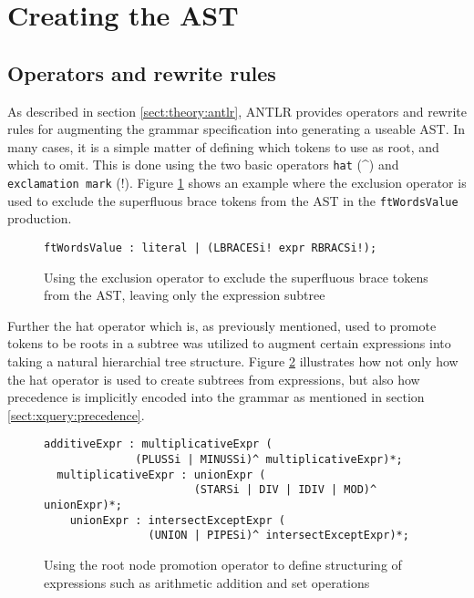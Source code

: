 \section{Creating the AST}
\subsection{Operators and rewrite rules}
As described in section \ref{sect:theory:antlr}, ANTLR provides operators and
rewrite rules for augmenting the grammar specification into generating a useable
AST. In many cases, it is a simple matter of defining which tokens to use as
root, and which to omit. This is done using the two basic operators \verb!hat!
(\^{}) and \verb!exclamation mark! (!). Figure \ref{code:ast:exoperator} shows an
example where the exclusion operator is used to exclude the superfluous brace
tokens from the AST in the \verb!ftWordsValue! production.

\begin{figure}[h]
\begin{verbatim}
ftWordsValue : literal | (LBRACESi! expr RBRACSi!);
\end{verbatim}
\caption[AST exclusion operator example]{Using the exclusion operator to exclude
the superfluous brace tokens from the AST, leaving only the expression subtree}
\label{code:ast:exoperator}
\end{figure}

Further the hat operator which is, as previously mentioned, used to promote
tokens to be roots in a subtree was utilized to augment certain expressions into
taking a natural hierarchial tree structure. Figure \ref{code:ast:hatoperator}
illustrates how not only how the hat operator is used to create subtrees from
expressions, but also how precedence is implicitly encoded into the grammar as
mentioned in section \ref{sect:xquery:precedence}.

\begin{figure}[h]
\begin{verbatim}
additiveExpr : multiplicativeExpr (
              (PLUSSi | MINUSSi)^ multiplicativeExpr)*;
  multiplicativeExpr : unionExpr (
                       (STARSi | DIV | IDIV | MOD)^ unionExpr)*;
    unionExpr : intersectExceptExpr (
                (UNION | PIPESi)^ intersectExceptExpr)*;
\end{verbatim}
\caption[AST root node promotion operator example]{Using the root node promotion
operator to define structuring of expressions such as arithmetic addition and set
operations}
\label{code:ast:hatoperator}
\end{figure}

